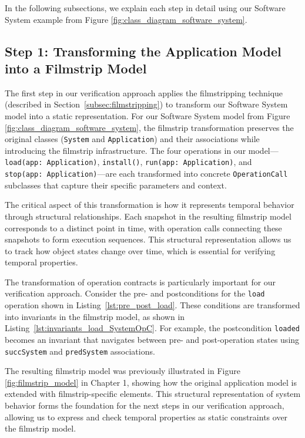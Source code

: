 In the following subsections, we explain each step in detail using our Software 
System example from Figure \ref{fig:class_diagram_software_system}.


\subsection{Step 1: Transforming the Application Model into a Filmstrip Model}

\hspace{1cm} The first step in our verification approach applies the filmstripping 
technique (described in Section~\ref{subsec:filmstripping}) to transform our Software 
System model into a static representation. 
For our Software System model from Figure \ref{fig:class_diagram_software_system}, 
the filmstrip transformation preserves the original classes (\texttt{System} and 
\texttt{Application}) and their associations while introducing the filmstrip 
infrastructure. The four operations in our model—\texttt{load(app:~Application)}, 
\texttt{install()}, \texttt{run(app:~Application)}, and 
\texttt{stop(app:~Application)}—are each transformed into concrete 
\texttt{OperationCall} subclasses that capture their specific parameters and context.

The critical aspect of this transformation is how it represents temporal behavior 
through structural relationships. Each snapshot in the resulting filmstrip model 
corresponds to a distinct point in time, with operation calls connecting these 
snapshots to form execution sequences. This structural representation allows us to 
track how object states change over time, which is essential for verifying temporal 
properties.

The transformation of operation contracts is particularly important for our 
verification approach. Consider the pre- and postconditions for the \texttt{load} 
operation shown in Listing~\ref{lst:pre_post_load}. These conditions are transformed 
into invariants in the filmstrip model, as shown in 
Listing~\ref{lst:invariants_load_SystemOpC}. For example, the postcondition 
\texttt{loaded} becomes an invariant that navigates between pre- and post-operation 
states using \texttt{succSystem} and \texttt{predSystem} associations.

The resulting filmstrip model was previously illustrated in Figure 
\ref{fig:filmstrip_model} in Chapter 1, showing how the original application model 
is extended with filmstrip-specific elements. This structural representation of 
system behavior forms the foundation for the next steps in our verification approach, 
allowing us to express and check temporal properties as static constraints over the 
filmstrip model.

